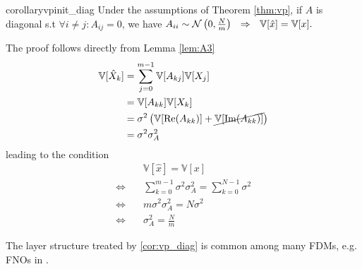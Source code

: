 \begin{restatable}{corollary}{vpinit_diag}\label{cor:vp_diag}
%
Under the assumptions of Theorem \ref{thm:vp}, if $A$ is diagonal s.t $\forall i \neq j: A_{ij} = 0$, we have
%
$
    A_{ii} \sim \mathcal{N}\left(0, \frac{N}{m}\right)~~\Rightarrow~~\mathbb{V}[\hat x] = \mathbb{V}[x].
$
    
\end{restatable}
%
\proof
The proof follows directly from Lemma \ref{lem:A3}
%
\begin{equation*}
    \begin{aligned}
        \mathbb{V}[\hat X_k] &= 
        \sum_{j=0}^{m-1} \mathbb{V}[A_{kj}] \mathbb{V}[{X_{j}}] \\
        &= \mathbb{V}[A_{kk}] \mathbb{V}[{X_{k}}] \\
        &= \sigma^2 \left(\mathbb{V}[\Re(A_{kk})] + \cancel{\mathbb{V}[\Im(A_{kk})]}\right)\\
        &= \sigma^2\sigma^2_A 
    \end{aligned}
\end{equation*}
leading to the condition 
    \[
        \begin{aligned}
         & \mathbb{V}[\hat x] =  \mathbb{V}[x]\\
        \Leftrightarrow\quad & \sum_{k=0}^{m-1} \sigma^2\sigma^2_A = \sum_{k=0}^{N-1} \sigma^2\\
        \Leftrightarrow\quad & m\sigma^2\sigma^2_A =  N \sigma^2 \\
        \Leftrightarrow\quad & \sigma^2_A =  \frac{N}{m}
        \end{aligned}
    \]
\endproof

The layer structure treated by \ref{cor:vp_diag} is common among many FDMs, e.g. FNOs in \citep{li2020fourier}.